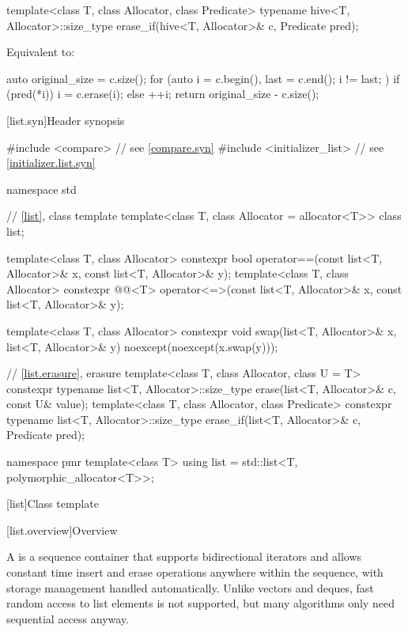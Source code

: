 %
\begin{itemdecl}
template<class T, class Allocator, class Predicate>
  typename hive<T, Allocator>::size_type
    erase_if(hive<T, Allocator>& c, Predicate pred);
\end{itemdecl}

\begin{itemdescr}
\pnum
\effects
Equivalent to:
\begin{codeblock}
auto original_size = c.size();
for (auto i = c.begin(), last = c.end(); i != last; ) {
  if (pred(*i)) {
    i = c.erase(i);
  } else {
    ++i;
  }
}
return original_size - c.size();
\end{codeblock}
\end{itemdescr}

[list.syn]{Header  synopsis}

%
\begin{codeblock}
#include <compare>              // see \ref{compare.syn}
#include <initializer_list>     // see \ref{initializer.list.syn}

namespace std {
  // \ref{list}, class template 
  template<class T, class Allocator = allocator<T>> class list;

  template<class T, class Allocator>
    constexpr bool operator==(const list<T, Allocator>& x, const list<T, Allocator>& y);
  template<class T, class Allocator>
    constexpr @@<T>
      operator<=>(const list<T, Allocator>& x, const list<T, Allocator>& y);

  template<class T, class Allocator>
    constexpr void swap(list<T, Allocator>& x, list<T, Allocator>& y)
      noexcept(noexcept(x.swap(y)));

  // \ref{list.erasure}, erasure
  template<class T, class Allocator, class U = T>
    constexpr typename list<T, Allocator>::size_type
      erase(list<T, Allocator>& c, const U& value);
  template<class T, class Allocator, class Predicate>
    constexpr typename list<T, Allocator>::size_type
      erase_if(list<T, Allocator>& c, Predicate pred);

  namespace pmr {
    template<class T>
      using list = std::list<T, polymorphic_allocator<T>>;
  }
}
\end{codeblock}

[list]{Class template }

[list.overview]{Overview}

\pnum
{}%
A
is a sequence container that supports
bidirectional iterators and allows constant time insert and erase
operations anywhere within the sequence, with storage management handled
automatically. Unlike vectors and deques,
fast random access to list elements is not supported, but many
algorithms only need sequential access anyway.

